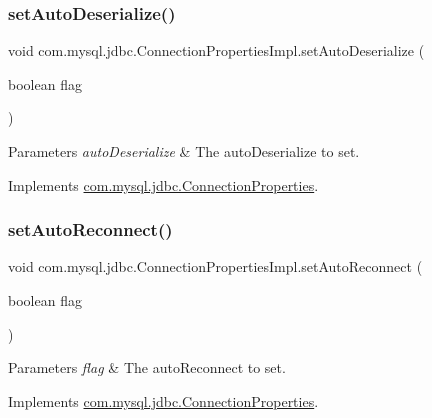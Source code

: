 \subsubsection{\texorpdfstring{set\+Auto\+Deserialize()}{setAutoDeserialize()}}
{\footnotesize\ttfamily void com.\+mysql.\+jdbc.\+Connection\+Properties\+Impl.\+set\+Auto\+Deserialize (\begin{DoxyParamCaption}\item[{boolean}]{flag }\end{DoxyParamCaption})}


\begin{DoxyParams}{Parameters}
{\em auto\+Deserialize} & The auto\+Deserialize to set. \\
\hline
\end{DoxyParams}


Implements \mbox{\hyperlink{interfacecom_1_1mysql_1_1jdbc_1_1_connection_properties_ac22dc46adecba26efb43a6fdc239e292}{com.\+mysql.\+jdbc.\+Connection\+Properties}}.

\mbox{\label{classcom_1_1mysql_1_1jdbc_1_1_connection_properties_impl_ad6ee40ab61735068bba0e16798ac8606}} 
\subsubsection{\texorpdfstring{set\+Auto\+Reconnect()}{setAutoReconnect()}}
{\footnotesize\ttfamily void com.\+mysql.\+jdbc.\+Connection\+Properties\+Impl.\+set\+Auto\+Reconnect (\begin{DoxyParamCaption}\item[{boolean}]{flag }\end{DoxyParamCaption})}


\begin{DoxyParams}{Parameters}
{\em flag} & The auto\+Reconnect to set. \\
\hline
\end{DoxyParams}


Implements \mbox{\hyperlink{interfacecom_1_1mysql_1_1jdbc_1_1_connection_properties_aee554c71f65458593f28c1e7d79846d1}{com.\+mysql.\+jdbc.\+Connection\+Properties}}.


